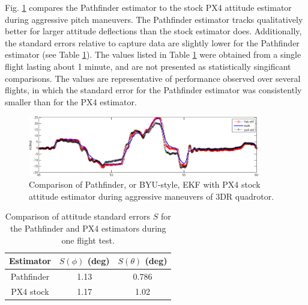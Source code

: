 \documentclass{article}
\begin{document}
Fig. \ref{fig:attcmp} compares the Pathfinder estimator to the stock PX4 attitude estimator during aggressive pitch maneuvers. The Pathfinder estimator tracks qualitatively better for larger attitude deflections than the stock estimator does. Additionally, the standard errors relative to  capture data are slightly lower for the Pathfinder estimator (see Table \ref{tab:attcmp}). The values listed in Table \ref{tab:attcmp} were obtained from a single flight lasting about 1 minute, and are not presented as statistically singificant comparisons. The values are representative of performance observed over several flights, in which the standard error for the Pathfinder estimator was consistently smaller than for the PX4 estimator.

\begin{figure}[tb!]
\centering
\includegraphics[width=0.9\textwidth]{../../sensor characterization/aug6_3dr_ekf_test1_pitch_cmp.png}
\caption{Comparison of Pathfinder, or BYU-style, EKF with PX4 stock attitude estimator during aggressive maneuvers of 3DR quadrotor.}
\label{fig:attcmp}
\end{figure}

\begin{table}[tb!]
\centering
\begin{tabular}{|c|c|c|}
\hline
Estimator & $S(\phi)$ (deg) & $S(\theta)$ (deg)\\
\hline
Pathfinder & 1.13 & 0.786\\
\hline
PX4 stock & 1.17 & 1.02\\
\hline
\end{tabular}
\caption{Comparison of attitude standard errors $S$ for the Pathfinder and PX4 estimators during one flight test.}
\label{tab:attcmp}
\end{table}

\printbibliography
\end{document}
